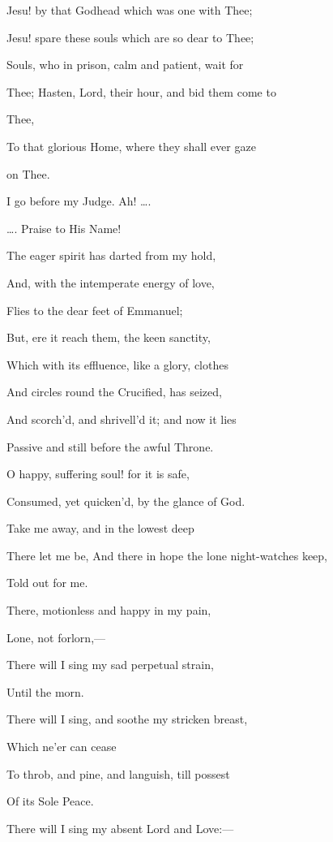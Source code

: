Jesu! by that Godhead which was one with Thee;

Jesu! spare these souls which are so dear to Thee;

Souls, who in prison, calm and patient, wait for

Thee; Hasten, Lord, their hour, and bid them come to

Thee,

To that glorious Home, where they shall ever gaze

on Thee.


I go before my Judge. Ah! ….


…. Praise to His Name!

The eager spirit has darted from my hold,

And, with the intemperate energy of love,

Flies to the dear feet of Emmanuel;

But, ere it reach them, the keen sanctity,

Which with its effluence, like a glory, clothes

And circles round the Crucified, has seized,

And scorch'd, and shrivell'd it; and now it lies

Passive and still before the awful Throne.

O happy, suffering soul! for it is safe,

Consumed, yet quicken'd, by the glance of God.


Take me away, and in the lowest deep

There let me be, And there in hope the lone night-watches keep,

Told out for me.

There, motionless and happy in my pain,

Lone, not forlorn,—

There will I sing my sad perpetual strain,

Until the morn.

There will I sing, and soothe my stricken breast,

Which ne'er can cease

To throb, and pine, and languish, till possest

Of its Sole Peace.

There will I sing my absent Lord and Love:—

